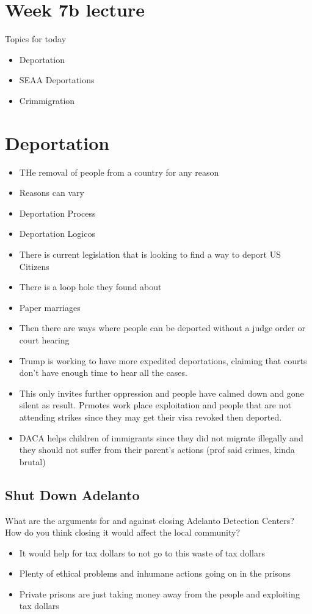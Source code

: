 \documentclass{article}
\begin{document}
\section*{Week 7b lecture}
Topics for today
\begin{itemize}
  \item Deportation
  \item SEAA Deportations
  \item Crimmigration
\end{itemize}

\section{Deportation}
\begin{itemize}
  \item THe removal of people from a country for any reason
  \item Reasons can vary
  \item Deportation Process
  \item Deportation Logicos
  \item There is current legislation that is looking to find a way to deport
    US Citizens
  \item There is a loop hole they found about
  \item Paper marriages
  \item Then there are ways where people can be deported without a judge order or
    court hearing
  \item Trump is working to have more expedited deportations,
    claiming that courts don't have enough time to hear all the cases.
  \item This only invites further oppression and people have calmed down and gone silent as result.
    Prmotes work place exploitation and people that are not attending strikes since they may get
    their visa revoked then deported.
  \item DACA helps children of immigrants since they did not migrate illegally and they
    should not suffer from their parent's actions (prof said crimes, kinda brutal)
\end{itemize}

\subsection{Shut Down Adelanto}
What are the arguments for and against closing Adelanto Detection Centers?
How do you think closing it would affect the local community?
\begin{itemize}
  \item It would help for tax dollars to not go to this waste of tax dollars
  \item Plenty of ethical problems and inhumane actions going on in the prisons
  \item Private prisons are just taking money away from the people
    and exploiting tax dollars
\end{itemize}
\end{document}
